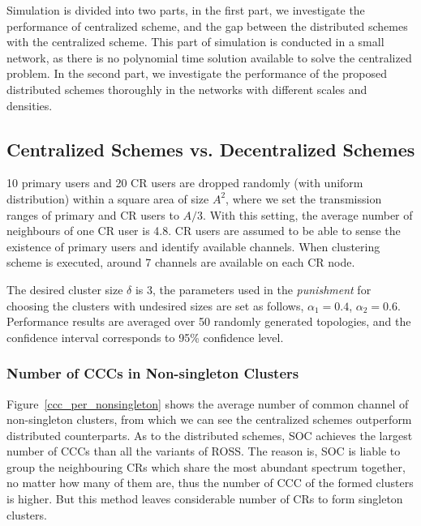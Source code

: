 \documentclass[10pt,journal,compsoc]{IEEEtran}
\theoremstyle{mytheoremstyle}
\theoremstyle{mytheoremstyle}
\theoremstyle{mytheoremstyle}
\begin{document}
Simulation is divided into two parts, in the first part, we investigate the performance of centralized scheme, and the gap between the distributed schemes with the centralized scheme.
This part of simulation is conducted in a small network, as there is no polynomial time solution available to solve the centralized problem.
In the second part, we investigate the performance of the proposed distributed schemes thoroughly in the networks with different scales and densities.

\subsection{Centralized Schemes vs. Decentralized Schemes}
10 primary users and 20 CR users are dropped randomly (with uniform distribution) within a square area of size $A^{2}$, where we set the transmission ranges of primary and CR users to $A/3$.
With this setting, the average number of neighbours of one CR user is 4.8.
CR users are assumed to be able to sense the existence of primary users and identify available channels.
When clustering scheme is executed, around 7 channels are available on each CR node.

The desired cluster size $\delta$ is 3, the parameters used in the \textit{punishment} for choosing the clusters with undesired sizes are set as follows, $\alpha_1 =  0.4$, $\alpha_2 =  0.6$.
Performance results are averaged over 50 randomly generated topologies, and the confidence interval corresponds to 95\% confidence level.

\subsubsection{Number of CCCs in Non-singleton Clusters}
\label{ccc_20}
Figure~\ref{ccc_per_nonsingleton} shows the average number of common channel of non-singleton clusters,
from which we can see the centralized schemes outperform distributed counterparts.
As to the distributed schemes, SOC achieves the largest number of CCCs than all the variants of ROSS.
The reason is, SOC is liable to group the neighbouring CRs which share the most abundant spectrum together, no matter how many of them are, thus the number of CCC of the formed clusters is higher.
But this method leaves considerable number of CRs to form singleton clusters.
\end{document}
